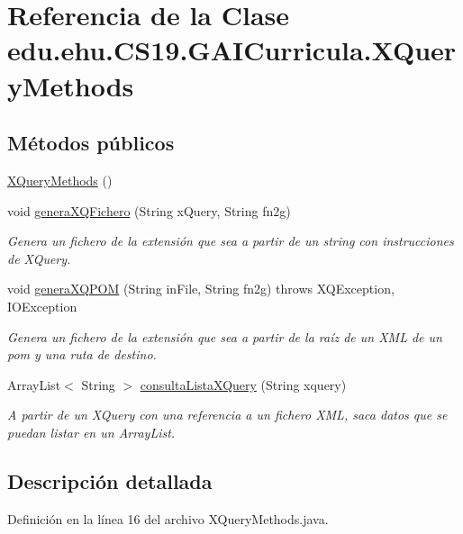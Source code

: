 \hypertarget{a00033}{}\section{Referencia de la Clase edu.\+ehu.\+C\+S19.\+G\+A\+I\+Curricula.\+X\+Query\+Methods}
\label{a00033}
\subsection*{Métodos públicos}
\begin{DoxyCompactItemize}
\item 
\mbox{\hyperlink{a00033_ade5a845ccb94c1feb5420a2550243985}{X\+Query\+Methods}} ()
\item 
void \mbox{\hyperlink{a00033_a7d2040d47b8350ca48da7ce5b658fab2}{genera\+X\+Q\+Fichero}} (String x\+Query, String fn2g)
\begin{DoxyCompactList}\small\item\em Genera un fichero de la extensión que sea a partir de un string con instrucciones de X\+Query. \end{DoxyCompactList}\item 
void \mbox{\hyperlink{a00033_ae60f32c5f8b4ffe3f2bdd1f44976eacf}{genera\+X\+Q\+P\+OM}} (String in\+File, String fn2g)  throws X\+Q\+Exception, I\+O\+Exception 
\begin{DoxyCompactList}\small\item\em Genera un fichero de la extensión que sea a partir de la raíz de un X\+ML de un pom y una ruta de destino. \end{DoxyCompactList}\item 
Array\+List$<$ String $>$ \mbox{\hyperlink{a00033_a8b0ac4baf3bbd3829073a87325dd714d}{consulta\+Lista\+X\+Query}} (String xquery)
\begin{DoxyCompactList}\small\item\em A partir de un X\+Query con una referencia a un fichero X\+ML, saca datos que se puedan listar en un Array\+List. \end{DoxyCompactList}\end{DoxyCompactItemize}


\subsection{Descripción detallada}


Definición en la línea 16 del archivo X\+Query\+Methods.\+java.



